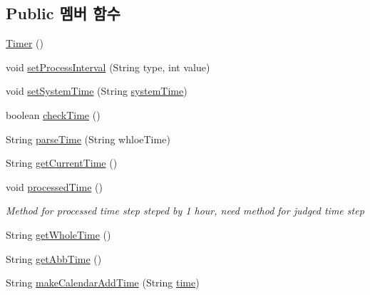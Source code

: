 \subsection*{Public 멤버 함수}
\begin{DoxyCompactItemize}
\item 
\mbox{\hyperlink{classcom_1_1github_1_1aites_1_1framework_1_1framework_1_1_timer_a24ab34fa51f125d3e3c5969776e2037b}{Timer}} ()
\item 
void \mbox{\hyperlink{classcom_1_1github_1_1aites_1_1framework_1_1framework_1_1_timer_ab6c30cfb7abd156bb1e42b81eda59d19}{set\+Process\+Interval}} (String type, int value)
\item 
void \mbox{\hyperlink{classcom_1_1github_1_1aites_1_1framework_1_1framework_1_1_timer_a3e6841d35a851c5320aa7d6a3d53db5e}{set\+System\+Time}} (String \mbox{\hyperlink{classcom_1_1github_1_1aites_1_1framework_1_1framework_1_1_timer_a22ebaa7134740910d846b3bdbd416aef}{system\+Time}})
\item 
boolean \mbox{\hyperlink{classcom_1_1github_1_1aites_1_1framework_1_1framework_1_1_timer_ac8714b167ade496a1a6baf8a30f56c51}{check\+Time}} ()
\item 
String \mbox{\hyperlink{classcom_1_1github_1_1aites_1_1framework_1_1framework_1_1_timer_a4923726c56eab4c2efc2d3f66b0c8cd1}{parse\+Time}} (String whloe\+Time)
\item 
String \mbox{\hyperlink{classcom_1_1github_1_1aites_1_1framework_1_1framework_1_1_timer_a7903fc53f33b3c29f586e5996f56d80e}{get\+Current\+Time}} ()
\item 
void \mbox{\hyperlink{classcom_1_1github_1_1aites_1_1framework_1_1framework_1_1_timer_a6f56ca908a3de33e23e16339573ae02f}{processed\+Time}} ()
\begin{DoxyCompactList}\small\item\em Method for processed time step steped by 1 hour, need method for judged time step \end{DoxyCompactList}\item 
String \mbox{\hyperlink{classcom_1_1github_1_1aites_1_1framework_1_1framework_1_1_timer_ad427101e1107bbea67e63333ea68a8fc}{get\+Whole\+Time}} ()
\item 
String \mbox{\hyperlink{classcom_1_1github_1_1aites_1_1framework_1_1framework_1_1_timer_a352607b26b1b13cef49ab6d75d575955}{get\+Abb\+Time}} ()
\item 
String \mbox{\hyperlink{classcom_1_1github_1_1aites_1_1framework_1_1framework_1_1_timer_a8139e285ba4eb7dba3459e836cf11146}{make\+Calendar\+Add\+Time}} (String \mbox{\hyperlink{classcom_1_1github_1_1aites_1_1framework_1_1framework_1_1_timer_a04901e0f7fd1f7024218cba52d7a8b26}{time}})
\end{DoxyCompactItemize}
